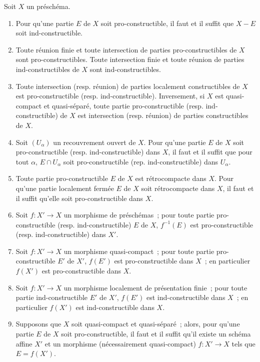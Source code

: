 \begin{proposition}[1.9.5]
\label{IV.1.9.5-fr}
Soit $X$ un préschéma.
\begin{enumerate}
  \item[(i)] Pour qu'une partie $E$ de $X$ soit pro-constructible, il faut et
  il suffit que $X-E$ soit ind-constructible.
  \item[(ii)] Toute réunion finie et toute intersection de parties
  pro-constructibles de $X$ sont pro-constructibles. Toute intersection
  finie et toute réunion de parties ind-constructibles de $X$ sont
  ind-constructibles.
  \item[(iii)] Toute intersection (resp. réunion) de parties localement
  constructibles de $X$ est pro-constructible (resp. ind-constructible).
  Inversement, si $X$ est quasi-compact et quasi-séparé, toute partie
  pro-constructible (resp. ind-constructible) de $X$ est intersection (resp.
  réunion) de parties constructibles de $X$.
  \item[(iv)] Soit $(U_\alpha)$ un recouvrement ouvert de $X$. Pour qu'une
  partie $E$ de $X$ soit pro-constructible (resp. ind-constructible) dans
  $X$, il faut et il suffit que pour tout $\alpha$, $E\cap U_\alpha$ soit
  pro-constructible (rep. ind-constructible) dans $U_\alpha$.
  \item[(v)] Toute partie pro-constructible $E$ de $X$ est rétrocompacte
  dans $X$. Pour qu'une partie localement fermée $E$ de $X$ soit
  rétrocompacte dans $X$, il faut et il suffit qu'elle soit
  pro-constructible dans $X$.
  \item[(vi)] Soit $f:X'\to X$ un morphisme de préschémas~; pour toute partie
  pro-constructible (resp. ind-constructible) $E$ de $X$, $f^{-1}(E)$ est
  pro-constructible (resp. ind-constructible) dans $X'$.
  \item[(vii)] Soit $f:X'\to X$ un morphisme quasi-compact~; pour toute
  partie pro-constructible $E'$ de $X'$, $f(E')$ est pro-constructible dans
  $X$~; en particulier $f(X')$ est pro-constructible dans $X$.
  \item[(viii)] Soit $f:X'\to X$ un morphisme localement de présentation
  finie~; pour toute partie ind-constructible $E'$ de $X'$, $f(E')$ est
  ind-constructible dans $X$~; en particulier $f(X')$ est ind-constructible
  dans $X$.
  \item[(ix)] Supposons que $X$ soit quasi-compact et quasi-séparé~; alors,
  pour qu'une partie $E$ de $X$ soit pro-constructible, il faut et il suffit
  qu'il existe un schéma affine $X'$ et un morphisme (nécessairement
  quasi-compact) $f:X'\to X$ tels que $E=f(X')$.
\end{enumerate}
\end{proposition}

